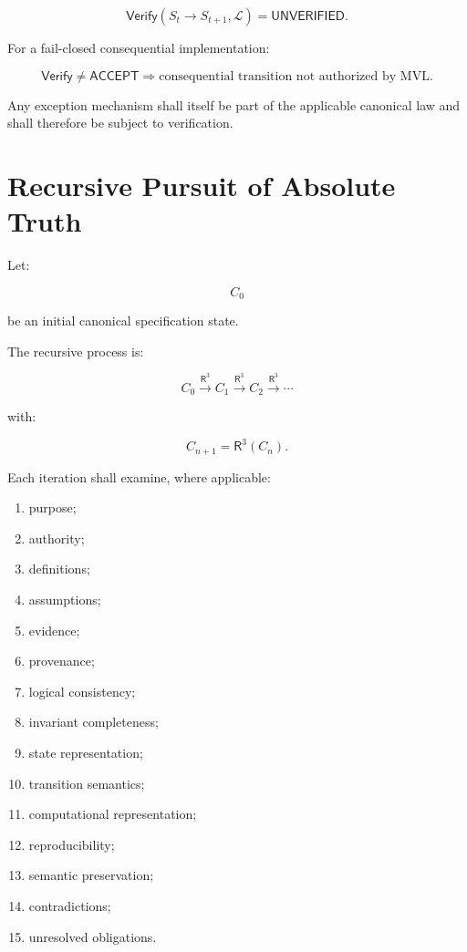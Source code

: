 \documentclass[11pt]{article}
\newcommand{\Rthree}{\ensuremath{\mathsf{R}^{3}}}
\newcommand{\Law}{\mathcal{L}}
\newcommand{\Verify}{\mathsf{Verify}}
\newcommand{\Accept}{\mathsf{ACCEPT}}
\newcommand{\Unknown}{\mathsf{UNVERIFIED}}
\begin{document}
\[
\boxed{
\Verify(S_t\rightarrow S_{t+1},\Law)=\Unknown.
}
\]

For a fail-closed consequential implementation:

\[
\boxed{
\Verify\neq\Accept
\Rightarrow
\text{consequential transition not authorized by MVL}.
}
\]

Any exception mechanism shall itself be part of the applicable
canonical law and shall therefore be subject to verification.

\section{Recursive Pursuit of Absolute Truth}

Let:

\[
C_0
\]

be an initial canonical specification state.

The recursive process is:

\[
C_0
\xrightarrow{\Rthree}
C_1
\xrightarrow{\Rthree}
C_2
\xrightarrow{\Rthree}
\cdots
\]

with:

\[
\boxed{
C_{n+1}=\Rthree(C_n).
}
\]

Each iteration shall examine, where applicable:

\begin{enumerate}
    \item purpose;
    \item authority;
    \item definitions;
    \item assumptions;
    \item evidence;
    \item provenance;
    \item logical consistency;
    \item invariant completeness;
    \item state representation;
    \item transition semantics;
    \item computational representation;
    \item reproducibility;
    \item semantic preservation;
    \item contradictions;
    \item unresolved obligations.
\end{enumerate}
\end{document}
